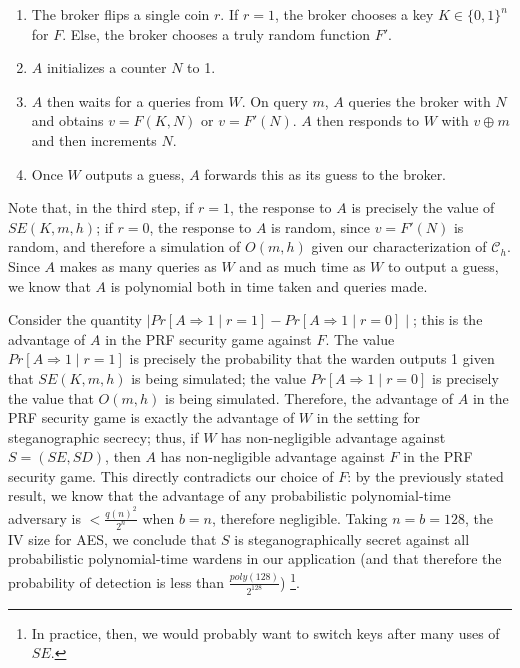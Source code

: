 \documentclass{article}
\begin{document}
\begin{enumerate}
\item{The broker flips a single coin $r$.  If $r=1$, the broker chooses a key $K \in \{0,1\}^n$ for $F$.  Else, 
the broker chooses a truly random function $F'$.}
\item{$A$ initializes a counter $N$ to 1.}
\item{$A$ then waits for a queries from $W$.  On query $m$, $A$ queries the broker with $N$ and obtains $v = F(K,N)$ or $v = F'(N)$.  
$A$ then responds to $W$ with $v \oplus m$ and then increments $N$.}
\item{Once $W$ outputs a guess, $A$ forwards this as its guess to the broker.}
\end{enumerate}

Note that, in the third step, if $r=1$, the response to $A$ is precisely the value of $SE(K,m,h)$; if $r=0$, the response to $A$ is random, 
since $v = F'(N)$ is random, and therefore a simulation of $O(m,h)$ given our characterization of $\mathcal{C}_h$.  Since $A$ makes as many 
queries as $W$ and as much time as $W$ to output a guess, we know that $A$ is polynomial both in time taken and queries made.

Consider the quantity $\mid Pr[A \Rightarrow 1 \mid r = 1] - Pr[A \Rightarrow 1 \mid r = 0] \mid$; this is the advantage of $A$ in the 
PRF security game against $F$.  The value $Pr[A \Rightarrow 1 \mid r = 1]$ is precisely the probability that the warden outputs 
1 given that $SE(K,m,h)$ is being simulated; the value $Pr[A \Rightarrow 1 \mid r = 0]$ is precisely the value that $O(m,h)$ is 
being simulated.  Therefore, the advantage of $A$ in the PRF security game is exactly the advantage of $W$ in the setting for 
steganographic secrecy; thus, if $W$ has non-negligible advantage against $S=(SE,SD)$, then $A$ has non-negligible advantage against 
$F$ in the PRF security game.  This directly contradicts our choice of $F$: by the previously stated result, we know that 
the advantage of any probabilistic polynomial-time adversary is $< \frac{q(n)^2}{2^{n}}$ when $b=n$, therefore negligible.
\newline\newline
\noindent Taking $n = b = 128$, the IV size for AES, we conclude that $S$ is steganographically secret against 
all probabilistic polynomial-time wardens in our application (and that therefore the probability of detection is less than 
$\frac{poly(128)}{2^{128}}$) \footnote{In practice, then, we would probably want to switch keys after many uses of $SE$.}.
 
\end{document}

